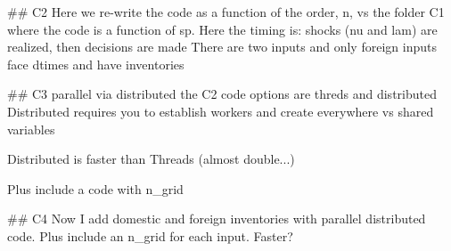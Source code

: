 
##
C2
Here we re-write the code as a function of the order, n, vs the folder C1 where the code is a function of sp.
Here the timing is: shocks (nu and lam) are realized, then decisions are made
There are two inputs and only foreign inputs face dtimes and have inventories


##
C3
parallel via distributed the C2 code
 options are threds and distributed
 Distributed requires you to establish workers and create everywhere vs shared variables

 Distributed is faster than Threads (almost double...)

 Plus include a code with n_grid 

##
C4
Now I add domestic and foreign inventories with parallel distributed code.
Plus include an n_grid for each input. Faster? 

